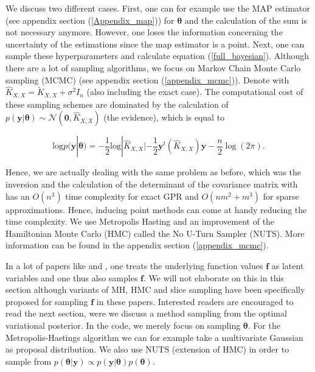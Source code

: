 \documentclass[12pt,a4paper,oneside]{book}
\begin{document}
We discuss two different cases. First, one can for example use the MAP estimator (see appendix section (\ref{Appendix_map})) for $\bm{\theta}$ and the calculation of the sum is not necessary anymore. However, one loses the information concerning the uncertainty of the estimations since the map estimator is a point. Next, one can sample these hyperparameters and calculate equation (\ref{full_bayesian}). Although there are a lot of sampling algorithms, we focus on Markov Chain Monte Carlo sampling (MCMC) (see appendix section (\ref{appendix_mcmc})). Denote with $\hat{K}_{X,X} = \tilde{K}_{X,X} + \sigma^2 I_n$ (also including the exact case). The computational cost of these sampling schemes are dominated by the calculation of $p(\bm{y}|\bm{\theta}) \sim \mathcal{N} (\bm{0}, \hat{K}_{X,X})$ (the evidence), which is equal to 

\begin{equation}\label{log_marg_ind_input}
\text{log}p(\bm{y}|\bm{\theta}) = -\dfrac{1}{2} \text{log}|\hat{K}_{X,X}| - \dfrac{1}{2} \bm{y}^t (\hat{K}_{X,X}) \bm{y} - \dfrac{n}{2} \log{(2\pi)}.
\end{equation}

Hence, we are actually dealing with the same problem as before, which was the inversion and the calculation of the determinant of the covariance matrix with has an $O(n^3)$ time complexity for exact GPR and $O(n m^2 +m^3)$ for sparse approximations. Hence, inducing point methods can come at handy reducing the time complexity. We use Metropolis Hasting and an improvement of the Hamiltonian Monte Carlo (HMC) called the No U-Turn Sampler (NUTS). More information can be found in the appendix section (\ref{appendix_mcmc}). 

In a lot of papers like \cite{modelscomparative} and \cite{murray2010slice}, one treats the underlying function values $\bm{f}$ as latent variables and one thus also samples $\bm{f}$. We will not elaborate on this in this section although variants of MH, HMC and slice sampling have been specifically proposed for sampling $\bm{f}$ in these papers. Interested readers are encouraged to read the next section, were we discuss a method sampling from the optimal variational posterior. In the code, we merely focus on sampling $\bm{\theta}$.  For the Metropolis-Hastings algorithm we can for example take a multivariate Gaussian as proposal distribution. We also use NUTS (extension of HMC) in order to sample from  $p(\bm{\theta}|\bm{y}) \propto p(\bm{y}| \bm{\theta}) p(\bm{\theta})$.
\end{document}
